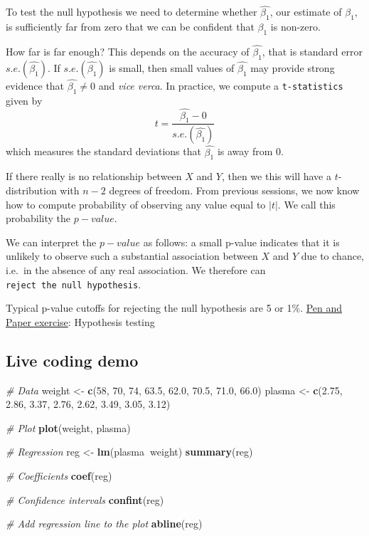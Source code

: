\documentclass[]{article}
\newenvironment{Shaded}{\begin{snugshade}}{\end{snugshade}}
\newcommand{\CommentTok}[1]{\textcolor[rgb]{0.56,0.35,0.01}{\textit{#1}}}
\newcommand{\DecValTok}[1]{\textcolor[rgb]{0.00,0.00,0.81}{#1}}
\newcommand{\FloatTok}[1]{\textcolor[rgb]{0.00,0.00,0.81}{#1}}
\newcommand{\KeywordTok}[1]{\textcolor[rgb]{0.13,0.29,0.53}{\textbf{#1}}}
\newcommand{\NormalTok}[1]{#1}
\newcommand{\OperatorTok}[1]{\textcolor[rgb]{0.81,0.36,0.00}{\textbf{#1}}}
\newcommand{\StringTok}[1]{\textcolor[rgb]{0.31,0.60,0.02}{#1}}
\begin{document}
To test the null hypothesis we need to determine whether
\(\hat{\beta_1}\), our estimate of \(\beta_1\), is sufficiently far from
zero that we can be confident that \(\beta_1\) is non-zero.

How far is far enough? This depends on the accuracy of
\(\hat{\beta_1}\), that is standard error \(s.e.(\hat{\beta_1})\). If
\(s.e.(\hat{\beta_1})\) is small, then small values of \(\hat{\beta_1}\)
may provide strong evidence that \(\hat{\beta_1}\neq0\) and \emph{vice
verca}. In practice, we compute a \texttt{t-statistics} given by
\[t=\frac{\hat{\beta_1}-0}{s.e.(\hat{\beta_1})}\] which measures the
standard deviations that \(\hat{\beta_1}\) is away from 0.

If there really is no relationship between \(X\) and \(Y\), then we this
will have a \(t\)-distribution with \(n-2\) degrees of freedom. From
previous sessions, we now know how to compute probability of observing
any value equal to \(|t|\). We call this probability the \(p-value\).

We can interpret the \(p-value\) as follows: a small p-value indicates
that it is unlikely to observe such a substantial association between
\(X\) and \(Y\) due to chance, i.e.~in the absence of any real
association. We therefore can \texttt{reject\ the\ null\ hypothesis}.

Typical p-value cutoffs for rejecting the null hypothesis are 5 or 1\%.
\href{pen-and-paper-plasma-volume.pdf}{Pen and Paper exercise}:
Hypothesis testing

\hypertarget{live-coding-demo}{%
\subsection{Live coding demo}\label{live-coding-demo}}

\begin{Shaded}
\begin{Highlighting}[]
\CommentTok{# Data}
\NormalTok{weight <-}\StringTok{ }\KeywordTok{c}\NormalTok{(}\DecValTok{58}\NormalTok{, }\DecValTok{70}\NormalTok{, }\DecValTok{74}\NormalTok{, }\FloatTok{63.5}\NormalTok{, }\FloatTok{62.0}\NormalTok{, }\FloatTok{70.5}\NormalTok{, }\FloatTok{71.0}\NormalTok{, }\FloatTok{66.0}\NormalTok{) }
\NormalTok{plasma <-}\StringTok{ }\KeywordTok{c}\NormalTok{(}\FloatTok{2.75}\NormalTok{, }\FloatTok{2.86}\NormalTok{, }\FloatTok{3.37}\NormalTok{, }\FloatTok{2.76}\NormalTok{, }\FloatTok{2.62}\NormalTok{, }\FloatTok{3.49}\NormalTok{, }\FloatTok{3.05}\NormalTok{, }\FloatTok{3.12}\NormalTok{) }

\CommentTok{# Plot}
\KeywordTok{plot}\NormalTok{(weight, plasma)}

\CommentTok{# Regression}
\NormalTok{reg <-}\StringTok{ }\KeywordTok{lm}\NormalTok{(plasma}\OperatorTok{~}\NormalTok{weight)}
\KeywordTok{summary}\NormalTok{(reg)}

\CommentTok{# Coefficients}
\KeywordTok{coef}\NormalTok{(reg)}

\CommentTok{# Confidence intervals}
\KeywordTok{confint}\NormalTok{(reg)}

\CommentTok{# Add regression line to the plot}
\KeywordTok{abline}\NormalTok{(reg)}
\end{Highlighting}
\end{Shaded}
\end{document}

